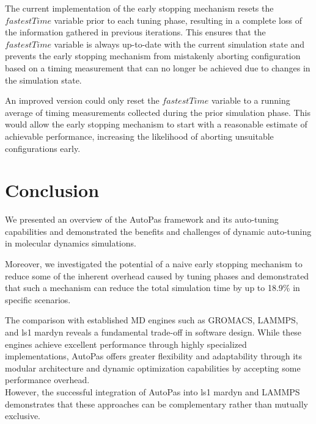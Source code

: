 \documentclass[conference]{IEEEtran}
\begin{document}
\begin{description}[leftmargin=1.2em, font=\itshape, style=nextline]
    \item[Limitations and Future Work:]
        The current implementation of the early stopping mechanism resets the $fastestTime$ variable prior to each tuning phase, resulting in a complete loss of the information gathered in previous iterations. This ensures that the $fastestTime$ variable is always up-to-date with the current simulation state and prevents the early stopping mechanism from mistakenly aborting configuration based on a timing measurement that can no longer be achieved due to changes in the simulation state.

        An improved version could only reset the $fastestTime$ variable to a running average of timing measurements collected during the prior simulation phase. This would allow the early stopping mechanism to start with a reasonable estimate of achievable performance, increasing the likelihood of aborting unsuitable configurations early.

\end{description}

\section{Conclusion}

We presented an overview of the AutoPas framework and its auto-tuning capabilities and demonstrated the benefits and challenges of dynamic auto-tuning in molecular dynamics simulations.

Moreover, we investigated the potential of a naive early stopping mechanism to reduce some of the inherent overhead caused by tuning phases and demonstrated that such a mechanism can reduce the total simulation time by up to 18.9\% in specific scenarios.

The comparison with established MD engines such as GROMACS, LAMMPS, and ls1 mardyn reveals a fundamental trade-off in software design. While these engines achieve excellent performance through highly specialized implementations, AutoPas offers greater flexibility and adaptability through its modular architecture and dynamic optimization capabilities by accepting some performance overhead.\\
However, the successful integration of AutoPas into ls1 mardyn and LAMMPS demonstrates that these approaches can be complementary rather than mutually exclusive.

\newpage



\end{document}
